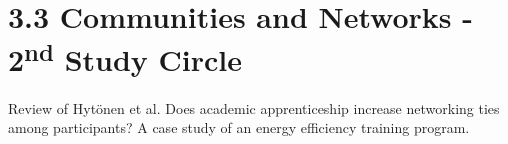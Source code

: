 \section*{3.3 Communities and Networks - 2\textsuperscript{nd} Study Circle}

\cite{hytonen2014does}
Review of Hytönen et al. Does academic apprenticeship increase networking ties among participants? A case study of an energy efficiency training program.